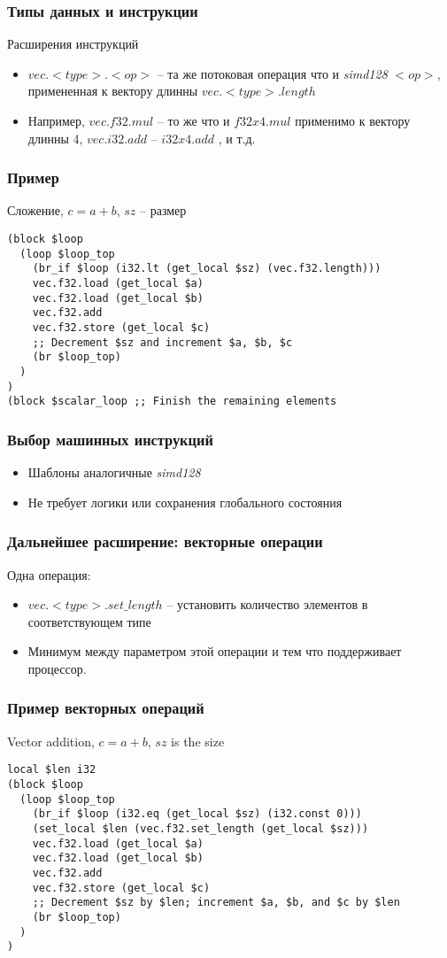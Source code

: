 \documentclass[t,aspectratio=169, xcolor={table}]{beamer}
\begin{document}
\begin{frame}
\frametitle{Типы данных и инструкции}
Расширения инструкций 
  \begin{itemize}
  \item $vec.<type>.<op>$ -- та же потоковая операция что и \textit{simd128} $<op>$, примененная к вектору длинны $vec.<type>.length$
  \item[] Например, $vec.f32.mul$ -- то же что и $f32x4.mul$ применимо к вектору длинны 4, $vec.i32.add$ -- $i32x4.add$ , и т.д.
  \end{itemize}
\end{frame}
\begin{frame}[containsverbatim]
\frametitle{Пример}
Сложение, $c = a + b$, $sz$ -- размер
\begin{lstlisting}
(block $loop
  (loop $loop_top
    (br_if $loop (i32.lt (get_local $sz) (vec.f32.length)))
    vec.f32.load (get_local $a)
    vec.f32.load (get_local $b)
    vec.f32.add
    vec.f32.store (get_local $c)
    ;; Decrement $sz and increment $a, $b, $c
    (br $loop_top)
  )
)
(block $scalar_loop ;; Finish the remaining elements
\end{lstlisting}
\end{frame}
\begin{frame}
\frametitle{Выбор машинных инструкций}
  \begin{itemize}
  \item Шаблоны аналогичные \textit{simd128}
  \item Не требует логики или сохранения глобального состояния
  \end{itemize}
\end{frame}
\begin{frame}
\frametitle{Дальнейшее расширение: векторные операции}
  Одна операция:

  \begin{itemize}
  \item $vec.<type>.set\_length$ -- установить количество элементов в соответствующем типе
  \item[] Минимум между параметром этой операции и тем что поддерживает процессор.
  \end{itemize}
\end{frame}
\begin{frame}[containsverbatim]
\frametitle{Пример векторных операций}
Vector addition, $c = a + b$, $sz$ is the size
\begin{lstlisting}
local $len i32
(block $loop
  (loop $loop_top
    (br_if $loop (i32.eq (get_local $sz) (i32.const 0)))
    (set_local $len (vec.f32.set_length (get_local $sz)))
    vec.f32.load (get_local $a)
    vec.f32.load (get_local $b)
    vec.f32.add
    vec.f32.store (get_local $c)
    ;; Decrement $sz by $len; increment $a, $b, and $c by $len
    (br $loop_top)
  )
)
\end{lstlisting}
\end{frame}
\end{document}
